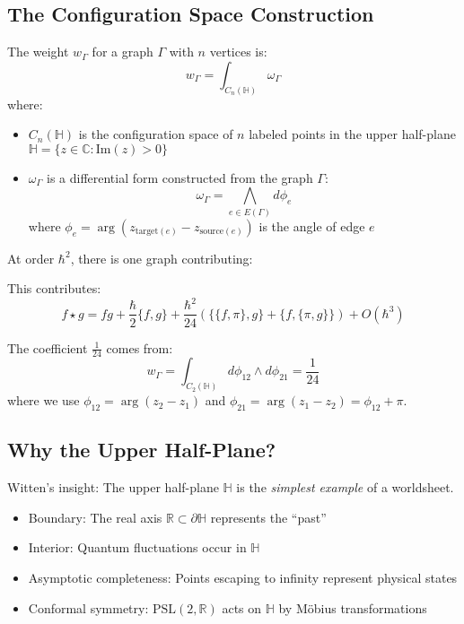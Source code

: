 \subsection{The Configuration Space Construction}

The weight $w_\Gamma$ for a graph $\Gamma$ with $n$ vertices is:
$$w_\Gamma = \int_{C_n(\mathbb{H})} \omega_\Gamma$$
where:
\begin{itemize}
\item $C_n(\mathbb{H})$ is the configuration space of $n$ labeled points in the upper half-plane $\mathbb{H} = \{z \in \mathbb{C} : \text{Im}(z) > 0\}$
\item $\omega_\Gamma$ is a differential form constructed from the graph $\Gamma$:
$$\omega_\Gamma = \bigwedge_{e \in E(\Gamma)} d\phi_e$$
where $\phi_e = \arg(z_{\text{target}(e)} - z_{\text{source}(e)})$ is the angle of edge $e$
\end{itemize}

\begin{example}
At order $\hbar^2$, there is one graph contributing:
\begin{center}
\end{center}

This contributes:
$$f \star g = fg + \frac{\hbar}{2}\{f,g\} + \frac{\hbar^2}{24}\left(\{\{f,\pi\}, g\} + \{f, \{\pi, g\}\}\right) + O(\hbar^3)$$

The coefficient $\frac{1}{24}$ comes from:
$$w_\Gamma = \int_{C_2(\mathbb{H})} d\phi_{12} \wedge d\phi_{21} = \frac{1}{24}$$
where we use $\phi_{12} = \arg(z_2 - z_1)$ and $\phi_{21} = \arg(z_1 - z_2) = \phi_{12} + \pi$.
\end{example}

\subsection{Why the Upper Half-Plane?}

Witten's insight: The upper half-plane $\mathbb{H}$ is the \emph{simplest example} of a worldsheet.

\begin{itemize}
\item Boundary: The real axis $\mathbb{R} \subset \partial\mathbb{H}$ represents the ``past''
\item Interior: Quantum fluctuations occur in $\mathbb{H}$
\item Asymptotic completeness: Points escaping to infinity represent physical states
\item Conformal symmetry: $\text{PSL}(2,\mathbb{R})$ acts on $\mathbb{H}$ by Möbius transformations
\end{itemize}

